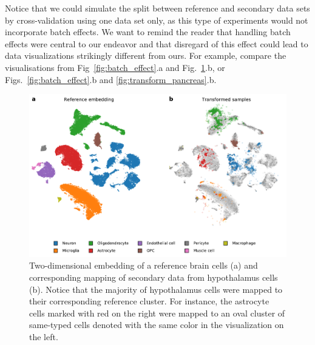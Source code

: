 \documentclass[runningheads]{llncs}
\begin{document}
Notice that we could simulate the split between reference and secondary data sets by cross-validation using one data set only, as this type of experiments would not incorporate batch effects. We want to remind the reader that handling batch effects were central to our endeavor and that disregard of this effect could lead to data visualizations strikingly different from ours. For example, compare the visualisations from Fig~\ref{fig:batch_effect}.a and Fig.~\ref{fig:transform_brain}.b, or Figs.~\ref{fig:batch_effect}.b and \ref{fig:transform_pancreas}.b.

\begin{figure}[htbp]
\includegraphics[width=\textwidth]{figures/transform_brain.pdf}
\caption{Two-dimensional embedding of a reference brain cells (a) and corresponding mapping of secondary data from hypothalamus cells (b). Notice that the majority of hypothalamus cells were mapped to their corresponding reference cluster. For instance, the astrocyte cells marked with red on the right were mapped to an oval cluster of same-typed cells denoted with the same color in the visualization on the left.} \label{fig:transform_brain}
\end{figure}
\end{document}
